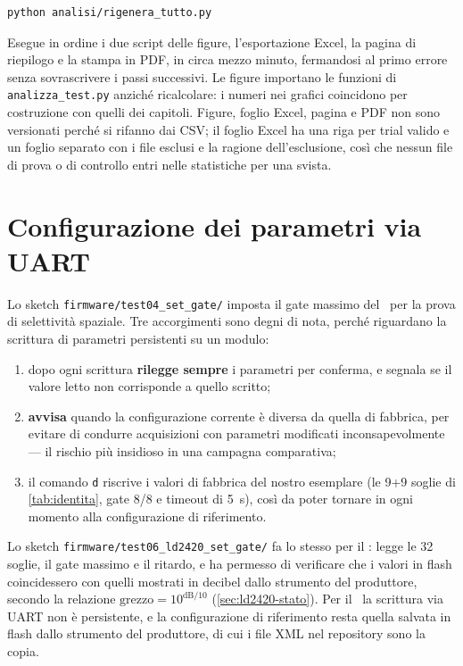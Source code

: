 \begin{lstlisting}[language=bash,basicstyle=\ttfamily\scriptsize]
python analisi/rigenera_tutto.py
\end{lstlisting}

Esegue in ordine i due script delle figure, l'esportazione Excel, la pagina di
riepilogo e la stampa in PDF, in circa mezzo minuto, fermandosi al primo errore senza
sovrascrivere i passi successivi. Le figure importano le funzioni di
\texttt{analizza\_test.py} anziché ricalcolare: i numeri nei grafici coincidono per
costruzione con quelli dei capitoli. Figure, foglio Excel, pagina e PDF non sono
versionati perché si rifanno dai CSV; il foglio Excel ha una riga per trial valido e
un foglio separato con i file esclusi e la ragione dell'esclusione, così che nessun
file di prova o di controllo entri nelle statistiche per una svista.

\section{Configurazione dei parametri via UART}

Lo sketch \texttt{firmware/test04\_set\_gate/} imposta il gate massimo del \ldb\ per
la prova di selettività spaziale. Tre accorgimenti sono degni di nota, perché
riguardano la scrittura di parametri persistenti su un modulo:

\begin{enumerate}[leftmargin=1.8em,itemsep=2pt]
  \item dopo ogni scrittura \textbf{rilegge sempre} i parametri per conferma, e
        segnala se il valore letto non corrisponde a quello scritto;
  \item \textbf{avvisa} quando la configurazione corrente è diversa da quella di
        fabbrica, per evitare di condurre acquisizioni con parametri modificati
        inconsapevolmente --- il rischio più insidioso in una campagna comparativa;
  \item il comando \texttt{d} riscrive i valori di fabbrica del nostro esemplare
        (le 9+9 soglie di \cref{tab:identita}, gate 8/8 e timeout di 5~s),
        così da poter tornare in ogni momento alla configurazione di riferimento.
\end{enumerate}

Lo sketch \texttt{firmware/test06\_ld2420\_set\_gate/} fa lo stesso per il \ldc:
legge le 32 soglie, il gate massimo e il ritardo, e ha permesso di verificare che i
valori in flash coincidessero con quelli mostrati in decibel dallo strumento del
produttore, secondo la relazione $\text{grezzo} = 10^{\text{dB}/10}$
(\cref{sec:ld2420-stato}). Per il \ldc\ la scrittura via UART non è persistente, e
la configurazione di riferimento resta quella salvata in flash dallo strumento del
produttore, di cui i file XML nel repository sono la copia.

